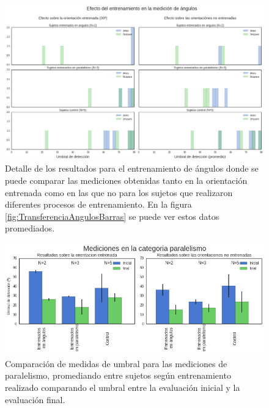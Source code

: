\documentclass{article}
\begin{document}
    \begin{figure}
        \center
        \includegraphics[width=\textwidth]{Imagenes/TransferenciaAngulos.png}
        \caption{Detalle de los resultados para el entrenamiento de ángulos donde se puede comparar las mediciones obtenidas tanto en la orientación entrenada como en las que no para los sujetos que realizaron diferentes procesos de entrenamiento. En la figura \ref{fig:TransferenciaAngulosBarras} se puede ver estos datos promediados.}
        \label{fig:TransferenciaAngulos}
    \end{figure}  
    
        \begin{figure}
        \center
        \includegraphics[width=\textwidth]{Imagenes/TransferenciaParalelismoBarras.png}
        \caption{Comparación de medidas de umbral para las mediciones de paralelismo, promediando entre sujetos según entrenamiento realizado comparando el umbral entre la evaluación inicial y la evaluación final.}
        \label{fig:TransferenciaParalelismoBarras}
    \end{figure}  
\end{document}
